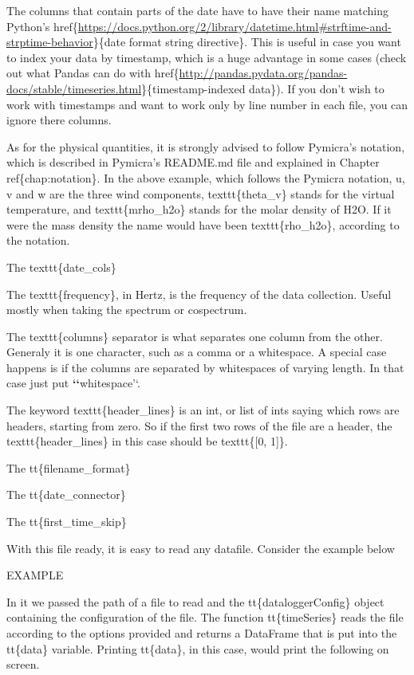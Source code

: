 \documentclass[a4paper,10pt,english]{sphinxmanual}
\begin{document}
The columns that contain parts of the date have to have their name matching
Python's
href\{\url{https://docs.python.org/2/library/datetime.html\#strftime-and-strptime-behavior}\}\{date
format string directive\}. This is useful in case you want to index your data by
timestamp, which is a huge advantage in some cases (check out what Pandas can do
with
href\{\url{http://pandas.pydata.org/pandas-docs/stable/timeseries.html}\}\{timestamp-indexed
data\}). If you don't wish to work with timestamps and want to work only by line
number in each file, you can ignore there columns.

As for the physical quantities, it is strongly advised to follow Pymicra's
notation, which is described in Pymicra's README.md file and explained in
Chapter ref\{chap:notation\}. In the above example, which follows the Pymicra
notation, u, v and w are the three wind components, texttt\{theta\_v\} stands for
the virtual temperature, and texttt\{mrho\_h2o\} stands for the molar density of
H2O. If it were the mass density the name would have been texttt\{rho\_h2o\},
according to the notation.

The texttt\{date\_cols\}

The texttt\{frequency\}, in Hertz, is the frequency of the data collection.
Useful mostly when taking the spectrum or cospectrum.

The texttt\{columns\} separator is what separates one column from the other.
Generaly it is one character, such as a comma or a whitespace. A special case
happens is if the columns are separated by whitespaces of varying length. In
that case just put {\color{red}\bfseries{}{}`{}`}whitespace'`.

The keyword texttt\{header\_lines\} is an int, or list of ints saying which rows
are headers, starting from zero. So if the first two rows of the file are a
header, the texttt\{header\_lines\} in this case should be texttt\{{[}0, 1{]}\}.

The tt\{filename\_format\}

The tt\{date\_connector\}

The tt\{first\_time\_skip\}

With this file ready, it is easy to read any datafile. Consider the example
below

EXAMPLE

In it we passed the path of a file to read and the tt\{dataloggerConfig\} object
containing the configuration of the file. The function tt\{timeSeries\} reads the
file according to the options provided and returns a DataFrame that is put into
the tt\{data\} variable. Printing tt\{data\}, in this case, would print the
following on screen.
\end{document}
